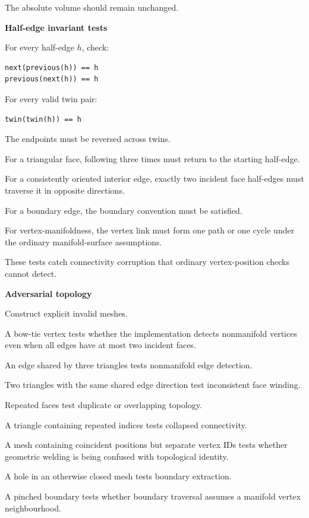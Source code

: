 The absolute volume should remain unchanged.

\textbf{Half-edge invariant tests}

For every half-edge \(h\), check:

\begin{verbatim}
next(previous(h)) == h
previous(next(h)) == h
\end{verbatim}

For every valid twin pair:

\begin{verbatim}
twin(twin(h)) == h
\end{verbatim}

The endpoints must be reversed across twins.

For a triangular face, following  three times must return to the starting half-edge.

For a consistently oriented interior edge, exactly two incident face half-edges must traverse it in opposite directions.

For a boundary edge, the boundary convention must be satisfied.

For vertex-manifoldness, the vertex link must form one path or one cycle under the ordinary manifold-surface assumptions.

These tests catch connectivity corruption that ordinary vertex-position checks cannot detect.

\textbf{Adversarial topology}

Construct explicit invalid meshes.

A bow-tie vertex tests whether the implementation detects nonmanifold vertices even when all edges have at most two incident faces.

An edge shared by three triangles tests nonmanifold edge detection.

Two triangles with the same shared edge direction test inconsistent face winding.

Repeated faces test duplicate or overlapping topology.

A triangle containing repeated indices tests collapsed connectivity.

A mesh containing coincident positions but separate vertex IDs tests whether geometric welding is being confused with topological identity.

A hole in an otherwise closed mesh tests boundary extraction.

A pinched boundary tests whether boundary traversal assumes a manifold vertex neighbourhood.


